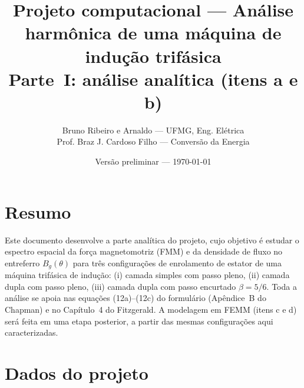 \documentclass[12pt,a4paper]{article}
\begin{document}

\title{\vspace{-1.5cm}\textbf{Projeto computacional --- Análise harmônica de uma máquina de indução trifásica}\\[0.2em]
\large Parte~I: análise analítica (itens \textbf{a} e \textbf{b})}
\author{Bruno Ribeiro e Arnaldo --- UFMG, Eng. Elétrica\\
\small Prof. Braz J. Cardoso Filho --- Conversão da Energia}
\date{Versão preliminar --- \today}

\maketitle

\section*{Resumo}

Este documento desenvolve a parte analítica do projeto, cujo objetivo é estudar o espectro espacial da força magnetomotriz (FMM) e da densidade de fluxo no entreferro $B_g(\theta)$ para três configurações de enrolamento de estator de uma máquina trifásica de indução: (i) camada simples com passo pleno, (ii) camada dupla com passo pleno, (iii) camada dupla com passo encurtado $\beta=5/6$. Toda a análise se apoia nas equações (12a)--(12c) do formulário (Apêndice~B do Chapman) e no Capítulo~4 do Fitzgerald. A modelagem em FEMM (itens c e d) será feita em uma etapa posterior, a partir das mesmas configurações aqui caracterizadas.

\section{Dados do projeto}
\end{document}
